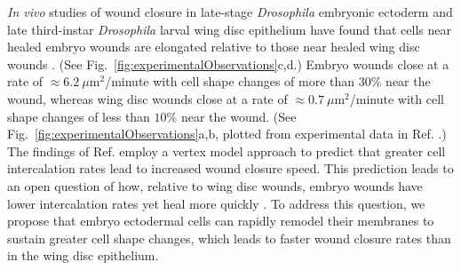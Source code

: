 \documentclass[%
 reprint,
superscriptaddress,
amsmath,amssymb,
prl,
floatfix,
]{revtex4-2}
\begin{document}
\textit{In vivo} studies of wound closure in late-stage \textit{Drosophila} embryonic ectoderm and late third-instar \textit{Drosophila} larval wing disc epithelium have found that cells near healed embryo wounds are elongated relative to those near healed wing disc wounds \cite{tetley2019tissue}. (See Fig.~\ref{fig:experimentalObservations}c,d.) Embryo wounds close at a rate of $\approx6.2~\mu $m$^2$/minute with cell shape changes of more than $30\%$ near the wound, whereas wing disc wounds close at a rate of $\approx0.7~\mu $m$^2$/minute with cell shape changes of less than $10\%$ near the wound.
(See Fig.~\ref{fig:experimentalObservations}a,b, plotted from experimental data in Ref. \cite{tetley2019tissue}.) The findings of Ref. \cite{tetley2019tissue} employ a vertex model approach \cite{alt2017vertex} to predict that greater cell intercalation rates lead to increased wound closure speed. This prediction leads to an open question of how, relative to wing disc wounds, embryo wounds have lower intercalation rates yet heal more quickly \cite{tetley2019tissue}. To address this question, we propose that embryo ectodermal cells can rapidly remodel their membranes to sustain greater cell shape changes, which leads to faster wound closure rates than in the wing disc epithelium. 
\end{document}
